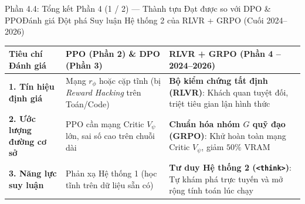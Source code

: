\begin{frame}{Phần 4.4: Tổng kết Phần 4 (1 / 2) --- Thành tựu Đạt được so với DPO \& PPO}{Đánh giá Đột phá Suy luận Hệ thống 2 của RLVR + GRPO (Cuối 2024--2026)}
  \vspace{0.05cm}
  \footnotesize
  \renewcommand{\arraystretch}{1.32}
  \begin{tabularx}{\textwidth}{@{}p{3.2cm} X X@{}}
    \toprule
    \textbf{Tiêu chí Đánh giá} & \textbf{PPO (Phần 2) \& DPO (Phần 3)} & \textbf{RLVR + GRPO (Phần 4 -- 2024--2026)} \\
    \midrule
    \textbf{1. Tín hiệu định giá} & Mạng $r_\phi$ hoặc cặp tĩnh (bị \textit{Reward Hacking} trên Toán/Code) & \textbf{\textcolor{tealgreen}{Bộ kiểm chứng tất định (RLVR)}}: Khách quan tuyệt đối, triệt tiêu gian lận hình thức \\
    \hline
    \textbf{2. Ước lượng đường cơ sở} & PPO cần mạng Critic $V_\psi$ lớn, sai số cao trên chuỗi dài & \textbf{\textcolor{tealgreen}{Chuẩn hóa nhóm $G$ quỹ đạo (GRPO)}}: Khử hoàn toàn mạng Critic $V_\psi$, giảm $50\%$ VRAM \\
    \hline
    \textbf{3. Năng lực suy luận} & Phản xạ Hệ thống 1 (học tĩnh trên dữ liệu sẵn có) & \textbf{\textcolor{tealgreen}{Tư duy Hệ thống 2 (\texttt{<think>})}}: Tự khám phá trực tuyến và mở rộng tính toán lúc chạy \\
    \bottomrule
  \end{tabularx}
\end{frame}

